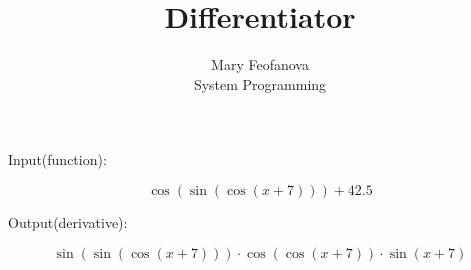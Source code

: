 \documentclass[12pt]{article}
\begin{document}
\title{Differentiator}
\author{Mary Feofanova\\
System Programming}
 
\maketitle
\begin{center}
Input(function):
\end{center}
$$\cos(\sin(\cos(x+7)))+42.5$$
\begin{center}
Output(derivative):
\end{center}
$$\sin(\sin(\cos(x+7))) \cdot \cos(\cos(x+7)) \cdot \sin(x+7)$$
\end{document}
